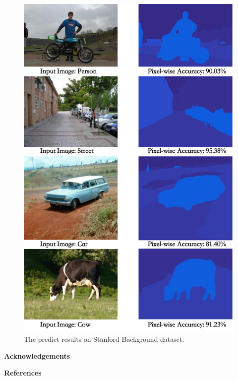 \documentclass[10.5pt,compsoc]{TsT}
\theoremstyle{mystyle}
\begin{document}
\begin{figure}
\centering
\includegraphics[width=0.85\columnwidth]{fig4.png}
\caption{The predict results on Stanford Background dataset.}
\label{fig4}
\end{figure} 


\vskip 2mm
\noindent
\textbf{Acknowledgements}
\vskip 2mm

\noindent

\vskip 2mm
\noindent
\textbf{References}
\vskip 2mm
\end{document}
